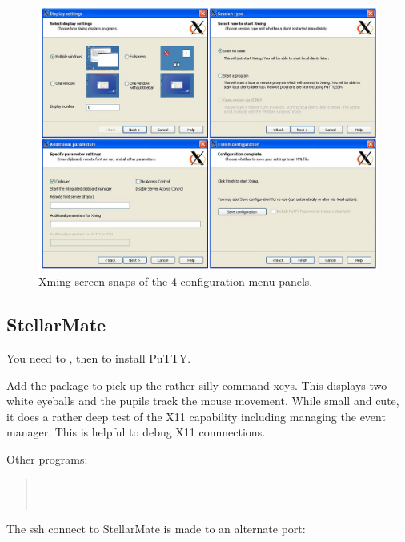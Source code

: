 \begin{figure}[h!]
\centering
\includegraphics[width=.75\textwidth]{images/XmingConfig.png}
\caption{Xming screen snaps of the 4 configuration menu panels.} %
\label{figure:XmingConfig}
\end{figure}



\subsection{StellarMate} \label{sec:StellarMate}

You need to , then 
to install PuTTY.

Add the  package to pick up the rather silly command
xeys. This displays two white eyeballs and the pupils track the mouse
movement. While small and cute, it does a rather deep test of the X11
capability including managing the event manager. This is helpful
to debug X11 connnections.

\begin{quote}
\end{quote}

Other programs:
\begin{quote}
  \\
          \\ 
\end{quote}


The ssh connect to StellarMate is made to an alternate port:


